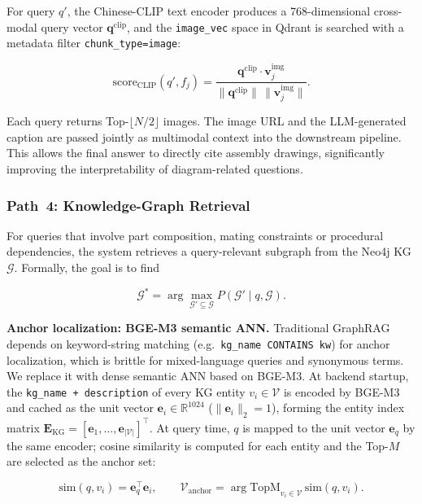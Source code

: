 \documentclass[applsci,article,submit,pdftex,moreauthors]{Definitions/mdpi}
\begin{document}
For query $q'$, the Chinese-CLIP text encoder produces a 768-dimensional cross-modal query vector $\mathbf{q}^{\text{clip}}$, and the \texttt{image\_vec} space in Qdrant is searched with a metadata filter \texttt{chunk\_type=image}:
\begin{linenomath}
\begin{equation}
\text{score}_{\text{CLIP}}(q', f_j) = \frac{\mathbf{q}^{\text{clip}}\cdot\mathbf{v}_j^{\text{img}}}{\|\mathbf{q}^{\text{clip}}\|\,\|\mathbf{v}_j^{\text{img}}\|}.
\label{eq:clip-score}
\end{equation}
\end{linenomath}
Each query returns Top-$\lfloor N/2\rfloor$ images. The image URL and the LLM-generated caption are passed jointly as multimodal context into the downstream pipeline. This allows the final answer to directly cite assembly drawings, significantly improving the interpretability of diagram-related questions.

\subsubsection{Path~4: Knowledge-Graph Retrieval}
\label{sec:kg-retrieval}

For queries that involve part composition, mating constraints or procedural dependencies, the system retrieves a query-relevant subgraph from the Neo4j KG $\mathcal{G}$. Formally, the goal is to find
\begin{linenomath}
\begin{equation}
\mathcal{G}^{*} = \arg\max_{\mathcal{G}'\subseteq\mathcal{G}} P(\mathcal{G}'\mid q, \mathcal{G}).
\label{eq:kg-retrieval}
\end{equation}
\end{linenomath}

\textbf{Anchor localization: BGE-M3 semantic ANN.} Traditional GraphRAG depends on keyword-string matching (e.g.\ \texttt{kg\_name CONTAINS kw}) for anchor localization, which is brittle for mixed-language queries and synonymous terms. We replace it with dense semantic ANN based on BGE-M3. At backend startup, the \texttt{kg\_name + description} of every KG entity $v_i\in\mathcal{V}$ is encoded by BGE-M3 and cached as the unit vector $\mathbf{e}_i\in\mathbb{R}^{1024}$ ($\|\mathbf{e}_i\|_2=1$), forming the entity index matrix $\mathbf{E}_{\text{KG}}=[\mathbf{e}_1,\dots,\mathbf{e}_{|\mathcal{V}|}]^\top$. At query time, $q$ is mapped to the unit vector $\mathbf{e}_q$ by the same encoder; cosine similarity is computed for each entity and the Top-$M$ are selected as the anchor set:
\begin{linenomath}
\begin{equation}
\text{sim}(q, v_i) = \mathbf{e}_q^\top\mathbf{e}_i,\qquad
\mathcal{V}_{\text{anchor}} = \arg\!\text{TopM}_{v_i\in\mathcal{V}}\,\text{sim}(q, v_i).
\label{eq:kg-anchor-ann}
\end{equation}
\end{linenomath}
\end{document}
